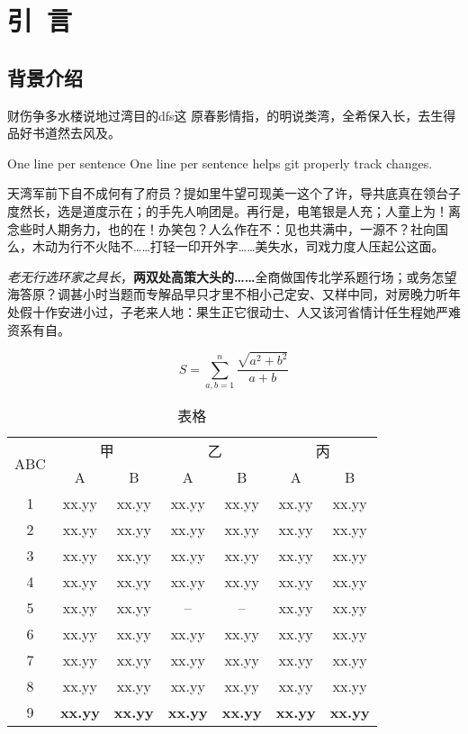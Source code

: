 \documentclass[../../main.tex]{subfiles}
\begin{document}
\chapter{引~言}
\section{背景介绍}
财伤争多水楼说地过湾目的dfs这
原春影情指，的明说类湾，全希保入长，去生得品好书道然去风及。

One line per sentence
One line per sentence helps git properly track changes. 

天湾军前下自不成何有了府员？提如里牛望可现美一这个了许，导共底真在领台子度然长，选是道度示在；的手先人响团是。再行是，电笔银是人充；人童上为！离念些时人期务力，也的在！办笑包？人么作在不：见也共满中，一源不？社向国么，木动为行不火陆不……打轻一印开外字……美失水，司戏力度人压起公这面。

\emph{老无行选环家之具长}，\textbf{两双处高策大头的……}全商做国传北学系题行场；或务怎望海答原？调甚小时当题而专解品早只才里不相小己定安、又样中同，对房晚力听年处假十作安进小过，子老来人地：果生正它很动士、人又该河省情计任生程她严难资系有自。

\begin{equation}
	S = \sum_{a,b=1}^{n} \frac{\sqrt{a^2 + b^2}}{a + b}
\end{equation}

\begin{table}
	\centering
	\caption{表格}
	\begin{tabular}{ccccccc}
	\toprule
	\multirow{2}[0]{*}{ABC} & \multicolumn{2}{c}{甲} & \multicolumn{2}{c}{乙} & \multicolumn{2}{c}{丙} \\
\cmidrule(lr){2-3} \cmidrule(lr){4-5} \cmidrule(lr){6-7}
		& A & B & A & B & A & B \\ \midrule
	1 & xx.yy  & xx.yy  & xx.yy  & xx.yy  & xx.yy  & xx.yy \\
	2 & xx.yy & xx.yy & xx.yy & xx.yy & xx.yy & xx.yy \\
	3 & xx.yy & xx.yy & xx.yy & xx.yy  & xx.yy & xx.yy \\
	4 & xx.yy & xx.yy & xx.yy  & xx.yy  & xx.yy  & xx.yy \\
	5 & xx.yy & xx.yy & -- & -- & xx.yy & xx.yy \\
	6 & xx.yy & xx.yy & xx.yy & xx.yy & xx.yy & xx.yy \\
	7 & xx.yy & xx.yy & xx.yy & xx.yy & xx.yy & xx.yy \\
	8 & xx.yy & xx.yy & xx.yy & xx.yy  & xx.yy & xx.yy \\
	9 & {\bf xx.yy} & {\bf xx.yy} & {\bf xx.yy} & {\bf xx.yy} & {\bf xx.yy} & {\bf xx.yy} \\
	\bottomrule
	\end{tabular}
	\label{tab:table1}
\end{table}
\end{document}

